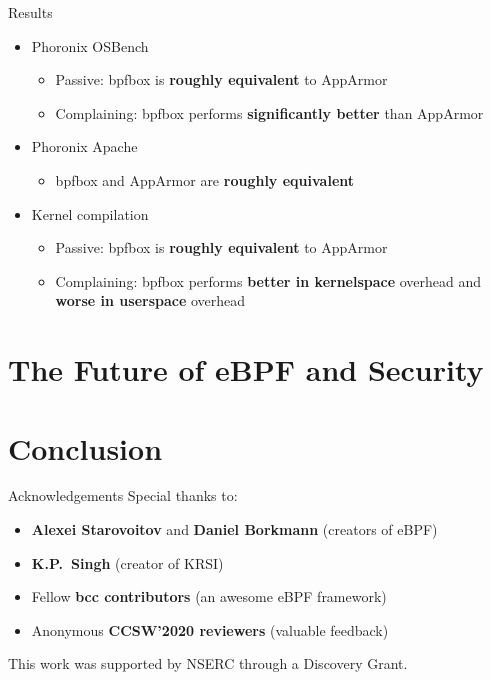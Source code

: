 \documentclass[12pt, dvipsnames, aspectratio=169]{beamer}
\begin{document}
\begin{frame}[c]{Results}
\begin{itemize}
    \item Phoronix OSBench
    \begin{itemize}
        \item Passive: bpfbox is \textbf{roughly equivalent} to AppArmor
        \item Complaining: bpfbox performs \textbf{significantly better} than AppArmor
    \end{itemize}

    \vfill
    \item Phoronix Apache
    \begin{itemize}
        \item bpfbox and AppArmor are \textbf{roughly equivalent}
    \end{itemize}

    \vfill
    \item Kernel compilation
    \begin{itemize}
        \item Passive: bpfbox is \textbf{roughly equivalent} to AppArmor
        \item Complaining: bpfbox performs \textbf{better in kernelspace} overhead and \textbf{worse in userspace} overhead
    \end{itemize}
\end{itemize}
\end{frame}

\section{The Future of eBPF and Security}

\section{Conclusion}

\begin{frame}[c]{Acknowledgements}
Special thanks to:
\begin{itemize}
    \item \textbf{Alexei Starovoitov} and \textbf{Daniel Borkmann} (creators of eBPF)
    \item \textbf{K.P.~Singh} (creator of KRSI)
    \item Fellow \textbf{bcc contributors} (an awesome eBPF framework)
    \item Anonymous \textbf{CCSW'2020 reviewers} (valuable feedback)
\end{itemize}
\vfill
This work was supported by NSERC through a Discovery Grant.
\end{frame}
\end{document}
